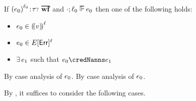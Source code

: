 

\begin{lemma}\label{H-label-progress}
  If\/ $\fwellformedO{\obars{\sexpr_0}{\sowner_0}}{\stoptional}$
  and\/ $\snil; \sowner_0 \sWSOP \sexpr_0$
  then one of the following holds:
  \begin{itemize}
    \item
      $e_0 \in {(\!(v)\!)}^{\ell}$
    \item
      $e_0 \in E[\mathsf{Err}]^{\ell}$
    \item
      $\exists\,e_1$ such that\/ $\sexpr_0 \credNanns \sexpr_1$
  \end{itemize}
\end{lemma}{
  \newcommand{\shortpf}{By case analysis of $\sexpr_0$.}
\begin{lamportproof*}
  \shortpf
\mainproof
  \shortpf

  By , it suffices to consider the following cases.

    \begin{pfproof}
      \qedstep
    \end{pfproof}

    \begin{pfproof}
      \qedstep
    \end{pfproof}


\end{lamportproof*}}
